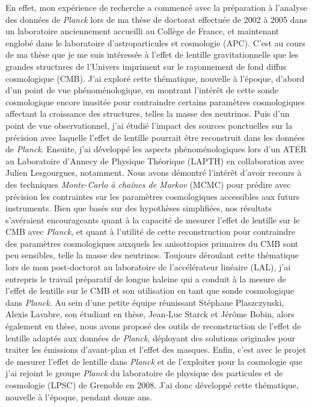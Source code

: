 \documentclass[a4paper, 12pt]{report}
\begin{document}
En effet, mon expérience de recherche a commencé avec la préparation
à l'analyse des données de \emph{Planck} lors de ma thèse de doctorat
effectuée de 2002 à 2005 dans un laboratoire anciennement accueilli au
Collège de France, et maintenant englobé dans le laboratoire
d'astroparticules et cosmologie (APC). C'est au cours de ma thèse que
je me suis intéressée à l'effet de lentille gravitationnelle que les
grandes structures de l'Univers impriment sur le rayonnement de fond
diffus cosmologique (CMB). J'ai exploré cette thématique, nouvelle à
l'époque, d'abord d'un point de vue phénoménologique, en montrant
l'intérêt de cette sonde cosmologique encore inusitée pour contraindre
certains paramètres cosmologiques affectant la croissance des
structures, telles la masse des neutrinos. Puis d'un point de vue
observationnel, j'ai étudié l'impact des sources ponctuelles sur la
précision avec laquelle l'effet de lentille pourrait être reconstruit
dans les données de \emph{Planck}. Ensuite, j'ai développé les aspects
phénoménologiques lors d'un ATER au Laboratoire d'Annecy de Physique
Théorique (LAPTH) en collaboration avec Julien Lesgourgues,
notamment. Nous avons démontré l'intérêt d'avoir recours à des
techniques \emph{Monte-Carlo à chaînes de Markov} (MCMC) pour prédire
avec précision les contraintes sur les paramètres cosmologiques
accessibles aux futurs instruments. Bien que basés sur des hypothèses
simplifiées, nos résultats s'avéraient encourageants quant à la
capacité de mesurer l'effet de lentille sur le CMB avec \emph{Planck}, et
quant à l'utilité de cette reconstruction pour contraindre des
paramètres cosmologiques auxquels les anisotropies primaires du CMB
sont peu sensibles, telle la masse des neutrinos. Toujours déroulant
cette thématique lors de mon post-doctorat au laboratoire de
l'accélérateur linéaire (LAL), j'ai entrepris le travail préparatif de
longue haleine qui a conduit à la mesure de l'effet de lentille sur le
CMB et son utilisation en tant que sonde cosmologique dans \emph{Planck}. Au
sein d'une petite équipe réunissant Stéphane Plaszczynski, Alexis
Lavabre, son étudiant en thèse, Jean-Luc Starck et Jérôme Bobin, alors
également en thèse, nous avons proposé des outils de reconstruction de
l'effet de lentille adaptés aux données de \emph{Planck}, déployant des
solutions originales pour traiter les émissions d'avant-plan et
l'effet des masques. Enfin, c'est avec le projet de mesurer l'effet de
lentille dans \emph{Planck} et de l'exploiter pour la cosmologie que j'ai
rejoint le groupe \emph{Planck} du laboratoire de physique des particules et
de cosmologie (LPSC) de Grenoble en 2008. J'ai donc développé cette
thématique, nouvelle à l'époque, pendant douze ans.
\end{document}
